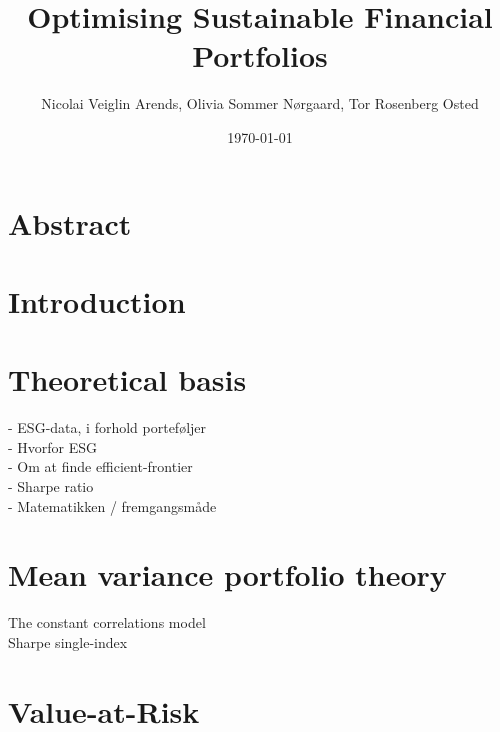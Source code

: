\documentclass[11pt]{article}
\title{\vspace{4.0cm} \Huge{Optimising Sustainable Financial Portfolios}}
\author{Nicolai Veiglin Arends, Olivia Sommer Nørgaard, Tor Rosenberg Osted }
\date{\today}
\def \ColourPDF {include/ku-farve}
\def \TitlePDF {include/nat-en}  %
\begin{document}


\clearpage\maketitle
\thispagestyle{empty}

\newpage
\thispagestyle{empty}
\section*{Abstract}



\newpage

\thispagestyle{empty}
\tableofcontents

\newpage

\setcounter{page}{1}
\section{Introduction}

\section{Theoretical basis}
- ESG-data, i forhold porteføljer\\
- Hvorfor ESG \\
- Om at finde efficient-frontier \\
- Sharpe ratio \\
- Matematikken / fremgangsmåde


\section{Mean variance portfolio theory}
The constant correlations model \\
Sharpe single-index

\section{Value-at-Risk}


\end{document}
